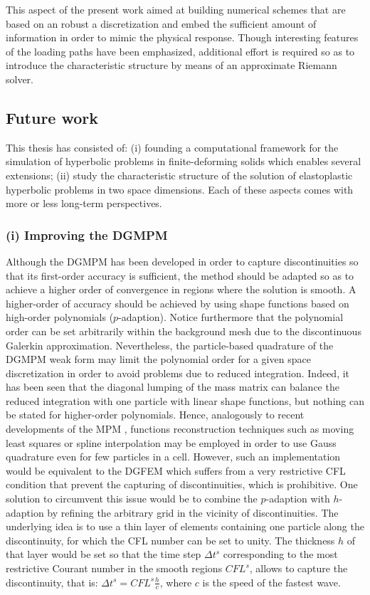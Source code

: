This aspect of the present work aimed at building numerical schemes that are based on an robust a discretization and embed the sufficient amount of information in order to mimic the physical response.
Though interesting features of the loading paths have been emphasized, additional effort is required so as to introduce the characteristic structure by means of an approximate Riemann solver.


\subsection*{Future work}
This thesis has consisted of: (i) founding a computational framework for the simulation of hyperbolic problems in finite-deforming solids which enables several extensions; (ii) study the characteristic structure of the solution of elastoplastic hyperbolic problems in two space dimensions.
Each of these aspects comes with more or less long-term perspectives.

\subsubsection*{(i) Improving the DGMPM}
Although the DGMPM has been developed in order to capture discontinuities so that its first-order accuracy is sufficient, the method should be adapted so as to achieve a higher order of convergence in regions where the solution is smooth.
A higher-order of accuracy should be achieved by using shape functions based on high-order polynomials ($p$-adaption).
Notice furthermore that the polynomial order can be set arbitrarily within the background mesh due to the discontinuous Galerkin approximation.
Nevertheless, the particle-based quadrature of the DGMPM weak form may limit the polynomial order for a given space discretization in order to avoid problems due to reduced integration.
Indeed, it has been seen that the diagonal lumping of the mass matrix can balance the reduced integration with one particle with linear shape functions, but nothing can be stated for higher-order polynomials.
Hence, analogously to recent developments of the MPM \cite{MPM_BSpline1,MPM_BSpline2,IMPM}, functions reconstruction techniques such as moving least squares or spline interpolation may be employed in order to use Gauss quadrature even for few particles in a cell.
However, such an implementation would be equivalent to the DGFEM which suffers from a very restrictive CFL condition that prevent the capturing of discontinuities, which is prohibitive.
One solution to circumvent this issue would be to combine the $p$-adaption with $h$-adaption by refining the arbitrary grid in the vicinity of discontinuities.
The underlying idea is to use a thin layer of elements containing one particle along the discontinuity, for which the CFL number can be set to unity.
The thickness $h$ of that layer would be set so that the time step $\Delta t^s$ corresponding to the most restrictive Courant number in the smooth regions $CFL^s$, allows to capture the discontinuity, that is: $\Delta t^s = CFL^s \frac{h}{c}$, where $c$ is the speed of the fastest wave.

